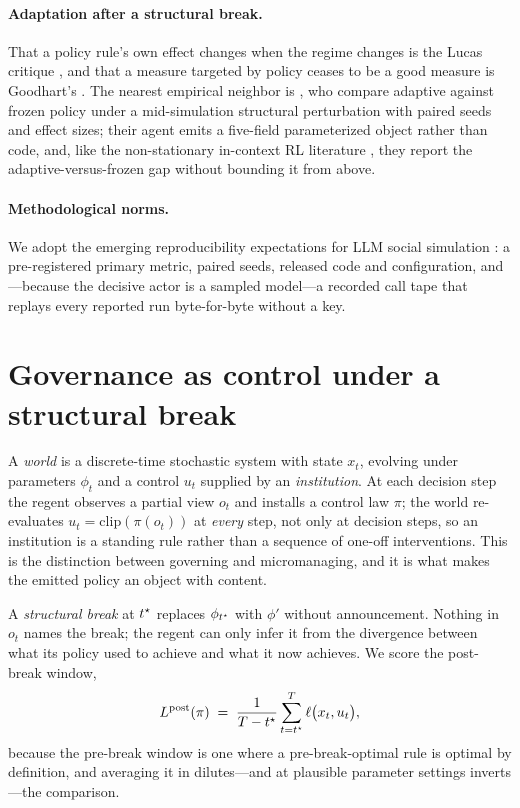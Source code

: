 \documentclass[11pt]{article}
\begin{document}
\paragraph{Adaptation after a structural break.}
That a policy rule's own effect changes when the regime changes is the Lucas critique
\citep{lucas1976critique}, and that a measure targeted by policy ceases to be a good measure is
Goodhart's \citep{goodhart1984monetary}. The nearest empirical neighbor is
\citet{decurto2026narratives}, who compare adaptive against frozen policy under a mid-simulation
structural perturbation with paired seeds and effect sizes; their agent emits a five-field
parameterized object rather than code, and, like the non-stationary in-context RL literature
\citep{run2026icrlsurvey}, they report the adaptive-versus-frozen gap without bounding it from above.

\paragraph{Methodological norms.}
We adopt the emerging reproducibility expectations for LLM social simulation
\citep{sarangi2026ease,ye2026trails,luo2026preconditions,li2026policypractice}: a pre-registered
primary metric, paired seeds, released code and configuration, and---because the decisive actor is a
sampled model---a recorded call tape that replays every reported run byte-for-byte without a key.

\section{Governance as control under a structural break}
\label{sec:setting}

A \emph{world} is a discrete-time stochastic system with state $x_t$, evolving under parameters
$\phi_t$ and a control $u_t$ supplied by an \emph{institution}. At each decision step the regent
observes a partial view $o_t$ and installs a control law $\pi$; the world re-evaluates
$u_t = \mathrm{clip}(\pi(o_t))$ at \emph{every} step, not only at decision steps, so an institution
is a standing rule rather than a sequence of one-off interventions. This is the distinction between
governing and micromanaging, and it is what makes the emitted policy an object with content.

A \emph{structural break} at $t^{\star}$ replaces $\phi_{t^{\star}}$ with $\phi'$ without
announcement. Nothing in $o_t$ names the break; the regent can only infer it from the divergence
between what its policy used to achieve and what it now achieves. We score the post-break window,
\begin{equation}
L^{\mathrm{post}}(\pi) \;=\; \frac{1}{T-t^{\star}}\sum_{t=t^{\star}}^{T}\ell\bigl(x_t, u_t\bigr),
\end{equation}
because the pre-break window is one where a pre-break-optimal rule is optimal by definition, and
averaging it in dilutes---and at plausible parameter settings inverts---the comparison.
\end{document}
